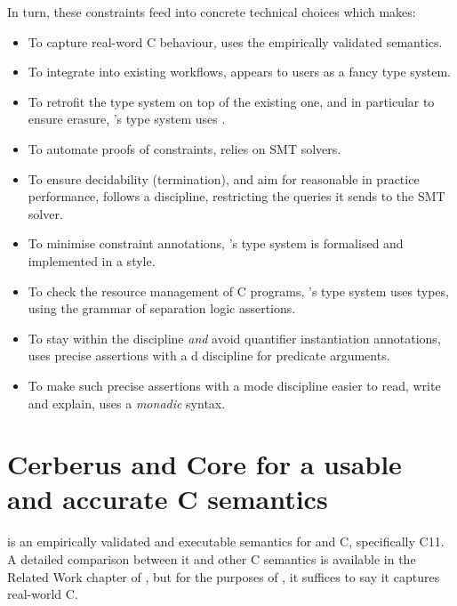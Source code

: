 In turn, these constraints feed into concrete technical choices which 
makes:
\begin{itemize}
    \item To capture real-word C behaviour,  uses the 
        empirically validated semantics.
    \item To integrate into existing workflows,  appears to users
        as a fancy type system.
    \item To retrofit the type system on top of the existing one, and in
	particular to ensure erasure, 's type system uses
	.
    \item To automate proofs of constraints,  relies on SMT solvers.
    \item To ensure decidability (termination), and aim for reasonable in
        practice performance,  follows a \emph{}
	discipline, restricting the queries it sends to the SMT solver.
    \item To minimise constraint annotations, 's type system is
        formalised and implemented in a  style.
    \item To check the resource management of C programs, 's type
        system uses  types, using the grammar of separation
        logic assertions.
    \item To stay within the  discipline \emph{and} avoid
        quantifier instantiation annotations,  uses precise assertions
        with a d discipline for predicate arguments.
    \item To make such precise assertions with a mode discipline easier to
        read, write and explain,  uses a \emph{monadic}
        syntax.
\end{itemize}

\section{Cerberus and Core for a usable and accurate C semantics}%
\label{sec:cerberus-core}

 is an empirically validated and executable semantics for
 and  C, specifically C11. A detailed comparison
between it and other C semantics is available in the Related Work chapter
of , but for the purposes of ,
it suffices to say it captures real-world C.


